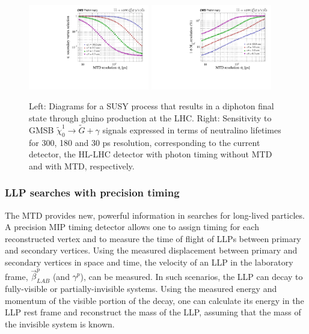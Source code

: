 \begin{figure}[hbtp]\begin{center}
\includegraphics[width=0.47\textwidth]{figures/MTD/171025_52.pdf}
\includegraphics[width=0.47\textwidth]{figures/MTD/171025_53.pdf}
\caption{ 
Left: Diagrams for a SUSY process that results in a diphoton final state through gluino production at the LHC. 
Right: Sensitivity to GMSB $\tilde{\chi}_0^1 \to \tilde{G} + \gamma$ signals expressed in
terms of neutralino lifetimes for 300, 180 and 30 ps resolution, corresponding to the current
detector, the HL-LHC detector with photon timing without MTD and with MTD, respectively.
}
\label{fig:cmsupgrade_photon}
\end{center}
\end{figure}


\subsubsection{LLP searches with precision timing}

The MTD provides new, powerful information in searches for long-lived particles. 
A precision MIP timing detector allows one to assign timing for each reconstructed vertex and to measure the time of flight of LLPs between primary and secondary vertices. 
Using the measured displacement between primary and secondary vertices in space and time, the velocity of an LLP in
the laboratory frame, $\vec{\beta}_{LAB}^{p}$ (and $\gamma^p$), can be measured. In such scenarios, the LLP can decay to fully-visible or partially-invisible systems. 
Using the measured energy and momentum of the visible portion of the decay, one can calculate its energy in the LLP rest frame and reconstruct the mass of the LLP, assuming that the mass of the invisible system is known. 

